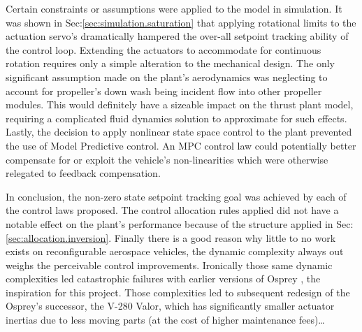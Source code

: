 \par
Certain constraints or assumptions were applied to the model in simulation. It was shown in Sec:\ref{sec:simulation.saturation} that applying rotational limits to the actuation servo's dramatically hampered the over-all setpoint tracking ability of the control loop. Extending the actuators to accommodate for continuous rotation requires only a simple alteration to the mechanical design. The only significant assumption made on the plant's aerodynamics was neglecting to account for propeller's down wash being incident flow into other propeller modules. This would definitely have a sizeable impact on the thrust plant model, requiring a complicated fluid dynamics solution to approximate for such effects. Lastly, the decision to apply nonlinear state space control to the plant prevented the use of Model Predictive control. An MPC control law could potentially better compensate for or exploit the vehicle's non-linearities which were otherwise relegated to feedback compensation.
\par
In conclusion, the non-zero state setpoint tracking goal was achieved by each of the control laws proposed. The control allocation rules applied did not have a notable effect on the plant's performance because of the structure applied in Sec:\ref{sec:allocation.inversion}. Finally there is a good reason why little to no work exists on reconfigurable aerospace vehicles, the dynamic complexity always out weighs the perceivable control improvements. Ironically those same dynamic complexities led catastrophic failures with earlier versions of Osprey \cite{ospreywired}, the inspiration for this project. Those complexities led to subsequent redesign of the Osprey's successor, the V-280 Valor, which has significantly smaller actuator inertias due to less moving parts (at the cost of higher maintenance fees)\ldots